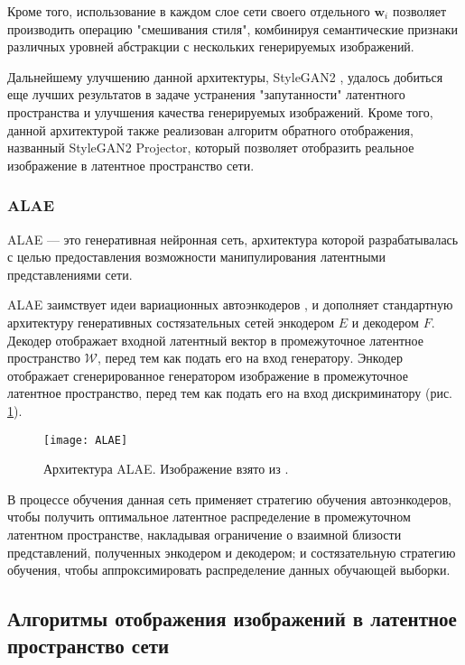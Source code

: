 Кроме того, использование в каждом слое сети своего отдельного $\mathbf w_i$ позволяет производить операцию "смешивания стиля", комбинируя семантические признаки различных уровней абстракции с нескольких генерируемых изображений.

Дальнейшему улучшению данной архитектуры, StyleGAN2 \cite{karras2020stylegan2}, удалось добиться еще лучших результатов в задаче устранения "запутанности" латентного пространства и улучшения качества генерируемых изображений.
Кроме того, данной архитектурой также реализован алгоритм обратного отображения, названный StyleGAN2 Projector, который позволяет отобразить реальное изображение в латентное пространство сети.

\subsubsection{ALAE}
ALAE \cite{ALAE} –-- это генеративная нейронная сеть, архитектура которой разрабатывалась с целью предоставления возможности манипулирования латентными представлениями сети.

ALAE заимствует идеи вариационных автоэнкодеров \cite{kingma2014vae}, и дополняет стандартную архитектуру генеративных состязательных сетей энкодером $E$ и декодером $F$.
Декодер отображает входной латентный вектор в промежуточное латентное пространство $\mathcal W$, перед тем как подать его на вход генератору.
Энкодер отображает сгенерированное генератором изображение в промежуточное латентное пространство, перед тем как подать его на вход дискриминатору (рис. \ref{fig:alae}).

\begin{figure}[h]
\begin{center}
    \texttt{[image: ALAE]}
    \caption{Архитектура ALAE. Изображение взято из \cite{ALAE}.}
    \label{fig:alae}
\end{center}
\end{figure}

В процессе обучения данная сеть применяет стратегию обучения автоэнкодеров, чтобы получить оптимальное латентное распределение в промежуточном латентном пространстве, накладывая ограничение о взаимной близости представлений, полученных энкодером и декодером;
и состязательную стратегию обучения, чтобы аппроксимировать распределение данных обучающей выборки.


\subsection{Алгоритмы отображения изображений в латентное пространство сети}

